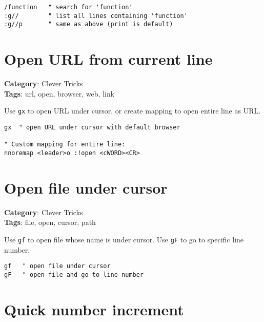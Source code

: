 {{\begin{Exa*}{}
\begin{Verbatim}[fontsize=\footnotesize, breaklines, breakanywhere]
/function   " search for 'function'
:g//        " list all lines containing 'function'
:g//p       " same as above (print is default)
\end{Verbatim}
\end{Exa*}

\section{Open URL from current line}

\textbf{Category}: Clever Tricks\\ \textbf{Tags}: url, open, browser, web, link
\vspace{0.5cm}

Use {\footnotesize \Verb§gx§} to open URL under cursor, or create mapping to open entire line as URL.

\begin{Exa*}{}
\begin{Verbatim}[fontsize=\footnotesize, breaklines, breakanywhere]
gx  " open URL under cursor with default browser

" Custom mapping for entire line:
nnoremap <leader>o :!open <cWORD><CR>
\end{Verbatim}
\end{Exa*}

\section{Open file under cursor}

\textbf{Category}: Clever Tricks\\ \textbf{Tags}: file, open, cursor, path
\vspace{0.5cm}

Use {\footnotesize \Verb§gf§} to open file whose name is under cursor. Use {\footnotesize \Verb§gF§} to go to specific line number.

\begin{Exa*}{}
\begin{Verbatim}[fontsize=\footnotesize, breaklines, breakanywhere]
gf   " open file under cursor
gF   " open file and go to line number
\end{Verbatim}
\end{Exa*}

\section{Quick number increment}

}}
